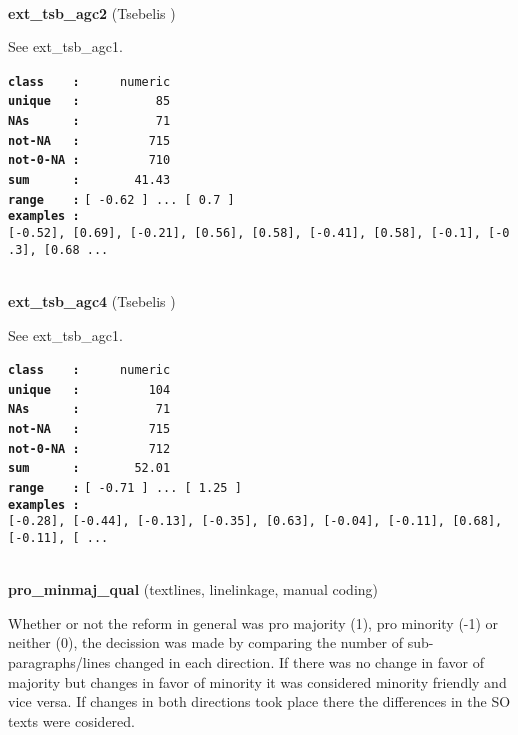 \documentclass[]{article}
\begin{document}
~

\textbf{ext\_tsb\_agc2} (Tsebelis )

See ext\_tsb\_agc1.

\textbf{\texttt{class\ \ \ \ :}} \texttt{~~~~~numeric}\\
\textbf{\texttt{unique\ \ \ :}} \texttt{~~~~~~~~~~85}\\
\textbf{\texttt{NAs\ \ \ \ \ \ :}} \texttt{~~~~~~~~~~71}\\
\textbf{\texttt{not-NA\ \ \ :}} \texttt{~~~~~~~~~715}\\
\textbf{\texttt{not-0-NA\ :}} \texttt{~~~~~~~~~710}\\
\textbf{\texttt{sum\ \ \ \ \ \ :}} \texttt{~~~~~~~41.43}\\
\textbf{\texttt{range\ \ \ \ :}}
\texttt{{[}\ -0.62\ {]}\ ...\ {[}\ 0.7\ {]}}\\
\textbf{\texttt{examples\ :}}
\texttt{{[}-0.52{]},\ {[}0.69{]},\ {[}-0.21{]},\ {[}0.56{]},\ {[}0.58{]},\ {[}-0.41{]},\ {[}0.58{]},\ {[}-0.1{]},\ {[}-0.3{]},\ {[}0.68\ ...}\\

~

\textbf{ext\_tsb\_agc4} (Tsebelis )

See ext\_tsb\_agc1.

\textbf{\texttt{class\ \ \ \ :}} \texttt{~~~~~numeric}\\
\textbf{\texttt{unique\ \ \ :}} \texttt{~~~~~~~~~104}\\
\textbf{\texttt{NAs\ \ \ \ \ \ :}} \texttt{~~~~~~~~~~71}\\
\textbf{\texttt{not-NA\ \ \ :}} \texttt{~~~~~~~~~715}\\
\textbf{\texttt{not-0-NA\ :}} \texttt{~~~~~~~~~712}\\
\textbf{\texttt{sum\ \ \ \ \ \ :}} \texttt{~~~~~~~52.01}\\
\textbf{\texttt{range\ \ \ \ :}}
\texttt{{[}\ -0.71\ {]}\ ...\ {[}\ 1.25\ {]}}\\
\textbf{\texttt{examples\ :}}
\texttt{{[}-0.28{]},\ {[}-0.44{]},\ {[}-0.13{]},\ {[}-0.35{]},\ {[}0.63{]},\ {[}-0.04{]},\ {[}-0.11{]},\ {[}0.68{]},\ {[}-0.11{]},\ {[}\ ...}\\

~

\textbf{pro\_minmaj\_qual} (textlines, linelinkage, manual coding)

Whether or not the reform in general was pro majority (1), pro minority
(-1) or neither (0), the decission was made by comparing the number of
sub-paragraphs/lines changed in each direction. If there was no change
in favor of majority but changes in favor of minority it was considered
minority friendly and vice versa. If changes in both directions took
place there the differences in the SO texts were cosidered.
\end{document}
